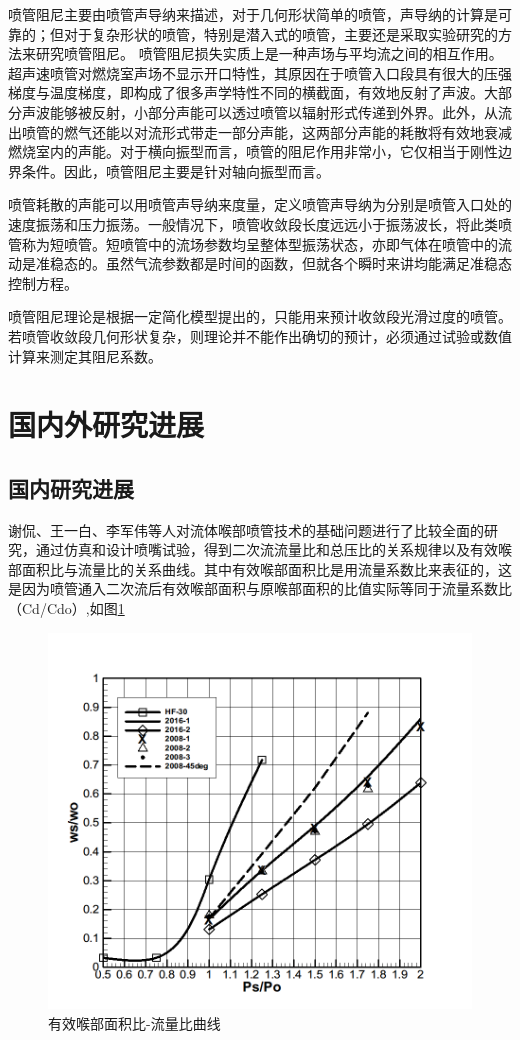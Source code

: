喷管阻尼主要由喷管声导纳来描述，对于几何形状简单的喷管，声导纳的计算是可靠的；但对于复杂形状的喷管，特别是潜入式的喷管，主要还是采取实验研究的方法来研究喷管阻尼。 
喷管阻尼损失实质上是一种声场与平均流之间的相互作用。超声速喷管对燃烧室声场不显示开口特性，其原因在于喷管入口段具有很大的压强梯度与温度梯度，即构成了很多声学特性不同的横截面，有效地反射了声波。大部分声波能够被反射，小部分声能可以透过喷管以辐射形式传递到外界。此外，从流出喷管的燃气还能以对流形式带走一部分声能，这两部分声能的耗散将有效地衰减燃烧室内的声能。对于横向振型而言，喷管的阻尼作用非常小，它仅相当于刚性边界条件。因此，喷管阻尼主要是针对轴向振型而言。

喷管耗散的声能可以用喷管声导纳来度量，定义喷管声导纳为分别是喷管入口处的速度振荡和压力振荡。一般情况下，喷管收敛段长度远远小于振荡波长，将此类喷管称为短喷管。短喷管中的流场参数均呈整体型振荡状态，亦即气体在喷管中的流动是准稳态的。虽然气流参数都是时间的函数，但就各个瞬时来讲均能满足准稳态控制方程。

喷管阻尼理论是根据一定简化模型提出的，只能用来预计收敛段光滑过度的喷管。若喷管收敛段几何形状复杂，则理论并不能作出确切的预计，必须通过试验或数值计算来测定其阻尼系数。
\section{国内外研究进展}
\subsection{国内研究进展}
谢侃、王一白、李军伟等人对流体喉部喷管技术的基础问题进行了比较全面的研究，通过仿真和设计喷嘴试验，得到二次流流量比和总压比的关系规律以及有效喉部面积比与流量比的关系曲线。其中有效喉部面积比是用流量系数比来表征的，这是因为喷管通入二次流后有效喉部面积与原喉部面积的比值实际等同于流量系数比（Cd/Cdo）,如图\ref{fig:flowvsperciliu}
\begin{figure}[htbp]
	\centering
	\includegraphics[width=0.7\linewidth]{figures/flowvsperciliu}
	\caption{有效喉部面积比-流量比曲线}
	\label{fig:flowvsperciliu}
\end{figure}

